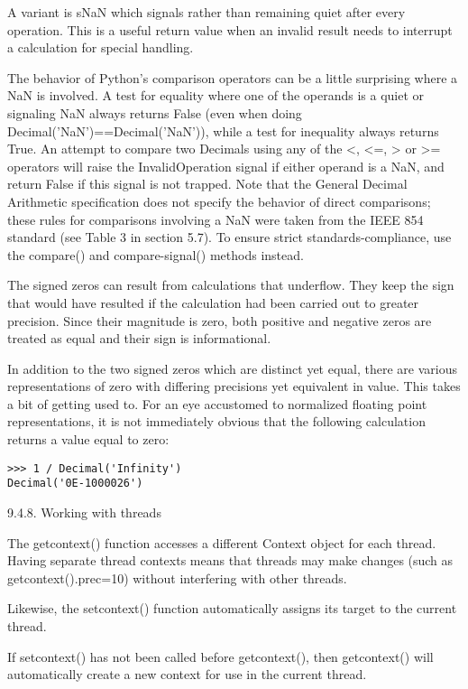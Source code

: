 A variant is sNaN which signals rather than remaining quiet after every operation. This is a useful return value when an invalid result needs to interrupt a calculation for special handling.

The behavior of Python’s comparison operators can be a little surprising where a NaN is involved. A test for equality where one of the operands is a quiet or signaling NaN always returns False (even when doing Decimal('NaN')==Decimal('NaN')), while a test for inequality always returns True. An attempt to compare two Decimals using any of the <, <=, > or >= operators will raise the InvalidOperation signal if either operand is a NaN, and return False if this signal is not trapped. Note that the General Decimal Arithmetic specification does not specify the behavior of direct comparisons; these rules for comparisons involving a NaN were taken from the IEEE 854 standard (see Table 3 in section 5.7). To ensure strict standards-compliance, use the compare() and compare-signal() methods instead.

The signed zeros can result from calculations that underflow. They keep the sign that would have resulted if the calculation had been carried out to greater precision. Since their magnitude is zero, both positive and negative zeros are treated as equal and their sign is informational.

In addition to the two signed zeros which are distinct yet equal, there are various representations of zero with differing precisions yet equivalent in value. This takes a bit of getting used to. For an eye accustomed to normalized floating point representations, it is not immediately obvious that the following calculation returns a value equal to zero:

\begin{lstlisting}
>>> 1 / Decimal('Infinity')
Decimal('0E-1000026')
\end{lstlisting}


9.4.8. Working with threads

The getcontext() function accesses a different Context object for each thread. Having separate thread contexts means that threads may make changes (such as getcontext().prec=10) without interfering with other threads.

Likewise, the setcontext() function automatically assigns its target to the current thread.

If setcontext() has not been called before getcontext(), then getcontext() will automatically create a new context for use in the current thread.

